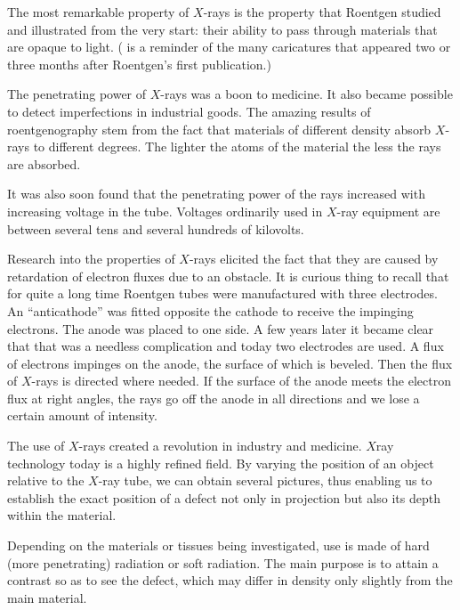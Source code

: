 The most remarkable property of $X$-rays is the property that Roentgen studied and illustrated from the very start: their ability to pass through materials that are opaque to light. ( is a reminder of the many caricatures that appeared two or three months after Roentgen's first publication.)

The penetrating power of $X$-rays was a boon to medi­cine. It also became possible to detect imperfections in industrial goods. The amazing results of roentgenography stem from the fact that materials of different density absorb $X$-rays to different degrees. The lighter the atoms of the material the less the rays are absorbed.

It was also soon found that the penetrating power of the rays increased with increasing voltage in the tube. Voltages ordinarily used in $X$-ray equipment are between several tens and several hundreds of kilovolts.

Research into the properties of $X$-rays elicited the fact that they are caused by retardation of electron fluxes due to an obstacle. It is curious thing to recall that for quite a long time Roentgen tubes were manufactured with three electrodes. An ``anticathode'' was fitted opposite the cathode to receive the impinging electrons. The anode was placed to one side. A few years later it became clear that that was a needless complication and today two electrodes are used. A flux of electrons impinges on the anode, the surface of which is beveled. Then the flux of $X$-rays is directed where needed. If the surface of the anode meets the electron flux at right angles, the rays go off the anode in all directions and we lose a certain amount of intensity.

The use of $X$-rays created a revolution in industry and medicine. $X$ray technology today is a highly refined field. By varying the position of an object relative to the $X$-ray tube, we can obtain several pictures, thus enabling us to establish the exact position of a defect not only in projection but also its depth within the ma­terial.

Depending on the materials or tissues being investigat­ed, use is made of hard (more penetrating) radiation or soft radiation. The main purpose is to attain a contrast so as to see the defect, which may differ in density only slightly from the main material.

